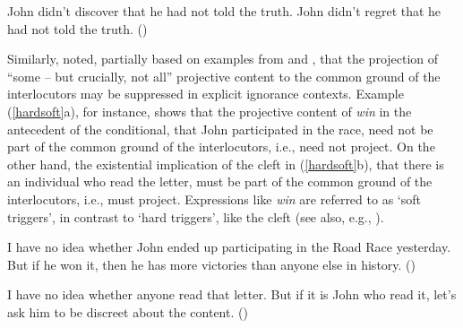 \documentclass[11pt,fleqn]{article}
\newcommand{\6}{\mbox{$[\hspace*{-.6mm}[$}}
\newcommand{\9}{\mbox{$]\hspace*{-.6mm}]$}}
\def\infelic{{\leavevmode\llap{\#}}}
\begin{document}
\begin{exe}
\ex\label{semi-factive}
\begin{xlist}
\ex John didn't discover that he had not told the truth.  
\ex John didn't regret that he had not told the truth.
\hfill (\citealt[63]{karttunen71b})

\end{xlist}
\end{exe}

Similarly, \citet[432]{simons01} noted, partially based on examples from \citealt{ccmg90} and \citealt{geurts94}, that the projection of ``some -- but crucially, not all'' projective content to the common ground of the interlocutors may be suppressed in explicit ignorance contexts. Example (\ref{hardsoft}a), for instance, shows that the projective content of {\em win} in the antecedent of the conditional, that John participated in the race, need not be part of the common ground of the interlocutors, i.e., need not project. On the other hand, the existential implication of the cleft in (\ref{hardsoft}b), that there is an individual who read the letter, must be part of the common ground of the interlocutors, i.e., must project. Expressions like {\em win} are referred to as `soft triggers', in contrast to `hard triggers', like the cleft (see also, e.g., \citealt{abusch10}).

\begin{exe}
\ex\label{hardsoft}
\begin{xlist}

\ex I have no idea whether John ended up participating in the Road Race yesterday. But if he won it, then he has more victories than anyone else in history. \hfill (\citealt[39]{abusch10})

\ex\infelic I have no idea whether anyone read that letter. But if it is John
who read it, let's ask him to be discreet about the content. \hfill (\citealt[40]{abusch10})

\end{xlist}
\end{exe}
\end{document}
